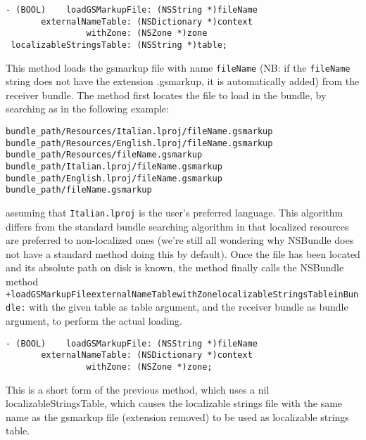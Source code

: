\begin{verbatim}
- (BOOL)    loadGSMarkupFile: (NSString *)fileName
       externalNameTable: (NSDictionary *)context
                withZone: (NSZone *)zone
 localizableStringsTable: (NSString *)table;
\end{verbatim}
This method loads the gsmarkup file with name \texttt{fileName} (NB: if
the \texttt{fileName} string does not have the extension .gsmarkup, it is
automatically added) from the receiver bundle.  The method first
locates the file to load in the bundle, by searching as in the
following example:
\begin{verbatim}
bundle_path/Resources/Italian.lproj/fileName.gsmarkup
bundle_path/Resources/English.lproj/fileName.gsmarkup
bundle_path/Resources/fileName.gsmarkup
bundle_path/Italian.lproj/fileName.gsmarkup
bundle_path/English.lproj/fileName.gsmarkup
bundle_path/fileName.gsmarkup
\end{verbatim}
assuming that \texttt{Italian.lproj} is the user's preferred language.
This algorithm differs from the standard bundle searching algorithm in
that localized resources are preferred to non-localized ones (we're
still all wondering why NSBundle does not have a standard method doing
this by default).  Once the file has been located and its absolute
path on disk is known, the method finally calls the NSBundle method
\texttt{+loadGSMarkupFile\discretionary{:}{}{:}externalNameTable\discretionary{:}{}{:}withZone\discretionary{:}{}{:}localizableStringsTable\discretionary{:}{}{:}inBundle:} 
with the given table as table argument, and the receiver bundle as
bundle argument, to perform the actual loading.

\begin{verbatim}
- (BOOL)    loadGSMarkupFile: (NSString *)fileName
       externalNameTable: (NSDictionary *)context
                withZone: (NSZone *)zone;
\end{verbatim}
This is a short form of the previous method, which uses a nil
localizableStringsTable, which causes the localizable strings file
with the same name as the gsmarkup file (extension removed) to be used as
localizable strings table.

